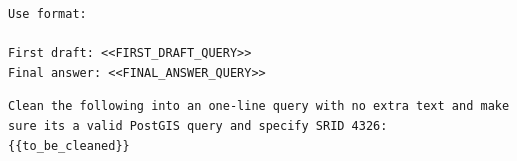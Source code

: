 \begin{tcolorbox}[title=PROMPT: PostGIS Prompt Generation, width=\linewidth, colframe=navy, breakable]
\begin{lstlisting}[basicstyle=\ttfamily\footnotesize,breaklines=true, columns=fullflexible,showstringspaces=false, keepspaces=true, belowskip=0pt, aboveskip=0pt,breakindent=0pt]
Use format:

First draft: <<FIRST_DRAFT_QUERY>>
Final answer: <<FINAL_ANSWER_QUERY>> \end{lstlisting}
\end{tcolorbox}

\begin{tcolorbox}[title=PROMPT: Clean Query, width=\linewidth, colframe=navy]
    \begin{lstlisting}[basicstyle=\ttfamily\footnotesize,breaklines=true, columns=fullflexible,showstringspaces=false, keepspaces=true, belowskip=0pt, aboveskip=0pt,breakindent=0pt] 
Clean the following into an one-line query with no extra text and make sure its a valid PostGIS query and specify SRID 4326: {{to_be_cleaned}}\end{lstlisting}
\end{tcolorbox}

